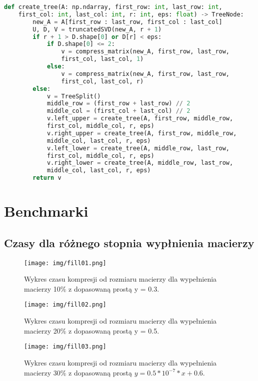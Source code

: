 \documentclass{article}
\begin{document}
\begin{lstlisting}[language=Python]
    def create_tree(A: np.ndarray, first_row: int, last_row: int, 
    first_col: int, last_col: int, r: int, eps: float) -> TreeNode:
        new_A = A[first_row : last_row, first_col : last_col]
        U, D, V = truncatedSVD(new_A, r + 1)
        if r + 1 > D.shape[0] or D[r] < eps:
            if D.shape[0] <= 2:
                v = compress_matrix(new_A, first_row, last_row, 
                first_col, last_col, 1)
            else:
                v = compress_matrix(new_A, first_row, last_row, 
                first_col, last_col, r)
        else:
            v = TreeSplit()
            middle_row = (first_row + last_row) // 2
            middle_col = (first_col + last_col) // 2
            v.left_upper = create_tree(A, first_row, middle_row, 
            first_col, middle_col, r, eps)
            v.right_upper = create_tree(A, first_row, middle_row, 
            middle_col, last_col, r, eps)
            v.left_lower = create_tree(A, middle_row, last_row, 
            first_col, middle_col, r, eps)
            v.right_lower = create_tree(A, middle_row, last_row, 
            middle_col, last_col, r, eps)
        return v
\end{lstlisting}

\section{Benchmarki}

\subsection{Czasy dla różnego stopnia wypłnienia macierzy}

\begin{figure}[H]
    \captionsetup{justification=centering}
    \centering
  \texttt{[image: img/fill01.png]}
  \caption{Wykres czasu kompresji od rozmiaru macierzy dla wypełnienia macierzy 10\% z dopasowaną prostą y = 0.3.}
\end{figure}

\begin{figure}[H]
    \captionsetup{justification=centering}
    \centering
  \texttt{[image: img/fill02.png]}
  \caption{Wykres czasu kompresji od rozmiaru macierzy dla wypełnienia macierzy 20\% z dopasowaną prostą y = 0.5.}
\end{figure}

\begin{figure}[H]
    \captionsetup{justification=centering}
    \centering
  \texttt{[image: img/fill03.png]}
  \caption{Wykres czasu kompresji od rozmiaru macierzy dla wypełnienia macierzy 30\% z dopasowaną prostą $y = 0.5 * 10^{-7} * x + 0.6$.}
\end{figure}
\end{document}
